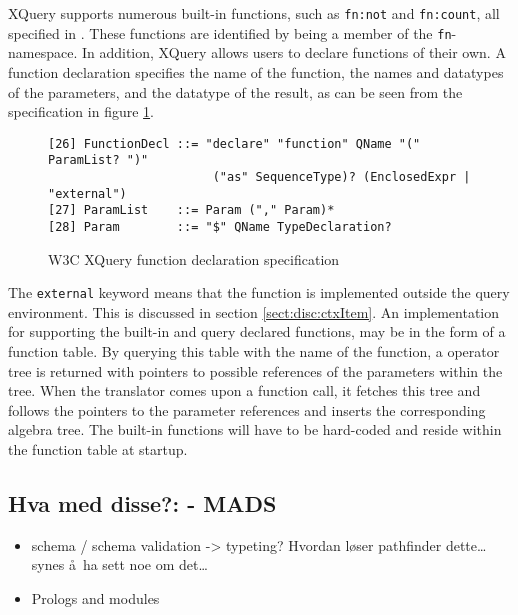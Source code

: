 XQuery supports numerous built-in functions, such as \texttt{fn:not} and \texttt{fn:count}, all
specified in \cite{w3cfuncOps}. These functions are identified by being a member of the \texttt{fn}-namespace. In
addition, XQuery allows users to declare functions of their own. A function declaration specifies the name of the
function, the names and datatypes of the parameters, and the datatype of the result, as can be seen from the
specification in figure \ref{fig:disc:not:funcEBNF}.

\begin{figure}[h]
\begin{Verbatim}
[26] FunctionDecl ::= "declare" "function" QName "(" ParamList? ")" 
                       ("as" SequenceType)? (EnclosedExpr | "external")
[27] ParamList    ::= Param ("," Param)*
[28] Param        ::= "$" QName TypeDeclaration?
\end{Verbatim}
\caption{W3C XQuery function declaration specification\cite{w3c00}\label{fig:disc:not:funcEBNF}}
\end{figure}

The \texttt{external} keyword means that the function is implemented outside the query environment. This is
discussed in section \ref{sect:disc:ctxItem}. An implementation for supporting the built-in and query declared
functions, may be in the form of a function table. By querying this table with the name of the function, a
operator tree is returned with pointers to possible references of the parameters within the tree. When the
translator comes upon a function call, it fetches this tree and follows the pointers to the parameter references
and inserts the corresponding algebra tree. The built-in functions will have to be hard-coded and reside within
the function table at startup.

\subsection{Hva med disse?: - {MADS}}

  	\begin{itemize}
  		\item schema / schema validation -> typeting? Hvordan l\o ser pathfinder dette\ldots synes \aa~ha sett noe om
  		det\ldots
  		\item Prologs and modules
  		\end{itemize}

